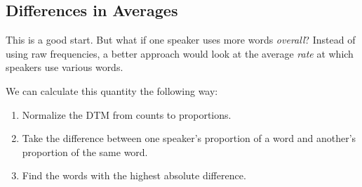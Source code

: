 \documentclass[]{book}
\providecommand{\tightlist}{%
  \setlength{\itemsep}{0pt}\setlength{\parskip}{0pt}}
\begin{document}
\subsection{Differences in Averages}\label{differences-in-averages}

This is a good start. But what if one speaker uses more words
\emph{overall}? Instead of using raw frequencies, a better approach
would look at the average \emph{rate} at which speakers use various
words.

We can calculate this quantity the following way:

\begin{enumerate}
\def\labelenumi{\arabic{enumi}.}
\tightlist
\item
  Normalize the DTM from counts to proportions.
\item
  Take the difference between one speaker's proportion of a word and
  another's proportion of the same word.
\item
  Find the words with the highest absolute difference.
\end{enumerate}
\end{document}
